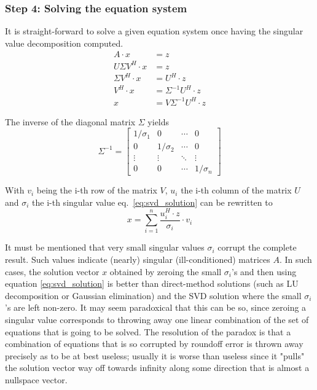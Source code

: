 \subsubsection{Step 4: Solving the equation system}

It is straight-forward to solve a given equation system once having
the singular value decomposition computed.
\begin{align}
A\cdot x &= z\\
U\Sigma V^H\cdot x &= z\\
\Sigma V^H\cdot x &= U^H \cdot z\\
V^H\cdot x &= \Sigma^{-1} U^H \cdot z\\
x &= V\Sigma^{-1} U^H \cdot z
\label{eq:svd_solution}
\end{align}

The inverse of the diagonal matrix $\Sigma$ yields
\begin{equation}
\Sigma^{-1} =
\begin{bmatrix}
1/\sigma_1 & 0 & \cdots & 0\\
0 & 1/\sigma_2 & \cdots & 0\\
\vdots & \vdots & \ddots & \vdots\\
0 & 0 & \cdots & 1/\sigma_n
\end{bmatrix}
\end{equation}

With $v_i$ being the i-th row of the matrix $V$, $u_i$ the i-th column
of the matrix $U$ and $\sigma_i$ the i-th singular value
eq.~\eqref{eq:svd_solution} can be rewritten to
\begin{equation}
x = \sum_{i=1}^{n} \dfrac{u_i^H\cdot z}{\sigma_i}\cdot v_i
\end{equation}

It must be mentioned that very small singular values $\sigma_i$
corrupt the complete result.  Such values indicate (nearly) singular
(ill-conditioned) matrices $A$.  In such cases, the solution vector
$x$ obtained by zeroing the small $\sigma_i$'s and then using equation
\eqref{eq:svd_solution} is better than direct-method solutions (such
as LU decomposition or Gaussian elimination) and the SVD solution
where the small $\sigma_i$'s are left non-zero. It may seem
paradoxical that this can be so, since zeroing a singular value
corresponds to throwing away one linear combination of the set of
equations that is going to be solved.  The resolution of the paradox
is that a combination of equations that is so corrupted by roundoff
error is thrown away precisely as to be at best useless; usually it is
worse than useless since it "pulls" the solution vector way off
towards infinity along some direction that is almost a nullspace
vector.

